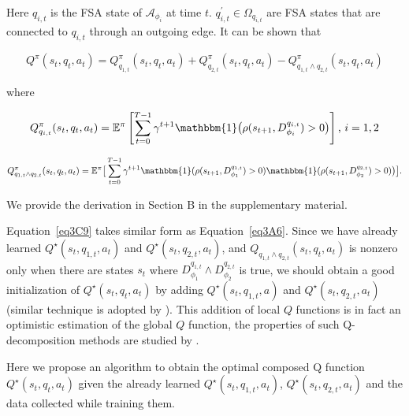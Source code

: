 \documentclass{article}
\begin{document}
\noindent Here $q_{i,t}$ is the FSA state of $\mathcal{A}_{\phi_i}$ at time $t$. $q_{i,t}^\prime \in \Omega_{q_{i,t}}$ are FSA states that are connected to $q_{i,t}$ through an outgoing edge. It can be shown that 

\begin{equation}\label{eq3C8}
Q^\pi(s_t, q_t, a_t) = Q^\pi_{q_{1,t}}(s_t, q_t, a_t) + Q^\pi_{q_{2,t}}(s_t, q_t, a_t) - Q^\pi_{q_{1,t} \wedge q_{2,t}}(s_t, q_t, a_t)
\end{equation}

\noindent where

\begin{equation}\label{eq3C9}
Q^\pi_{q_{i,t}}(s_t, q_t, a_t) = \mathbb{E}^\pi\left[\sum_{t=0}^{T-1} \gamma^{t+1}\mathbbm{1}\big(\rho(s_{t+1},D_{\phi_i}^{q_{i,t}})>0\big)\right] \textrm{, } i=1,2
\end{equation}

\begin{equation}\label{eq3C10}
Q^\pi_{q_{1,t} \wedge q_{2,t}}(s_t, q_t, a_t)=\mathbb{E}^\pi\big [ \sum^{T-1}_{t=0}\gamma^{t+1} \mathbbm{1}(\rho(s_{t+1},D_{\phi_1}^{q_{1,t}})>0)\mathbbm{1}(\rho(s_{t+1},D_{\phi_2}^{q_{2,t}})>0)\big)\big].
\end{equation}

\noindent We provide the derivation in Section B in the supplementary material.

Equation~\eqref{eq3C9} takes similar form as Equation~\eqref{eq3A6}. Since we have already learned $Q^\star(s_t,q_{1,t},a_t)$ and $Q^\star(s_t,q_{2,t},a_t)$, and $Q_{q_{1,t} \wedge q_{2,t}}(s_t, q_t, a_t)$ is nonzero only when there are states $s_t$ where $D^{q_{1,t}}_{\phi_1} \wedge D^{q_{2,t}}_{\phi_2}$ is true, we should obtain a good initialization of $Q^\star(s_t,q_t,a_t)$ by adding $Q^\star(s_t,q_{1,t},a)$ and $Q^\star(s_t,q_{2,t},a_t)$ (similar technique is adopted by \cite{haarnoja2018composable}). This addition of local $Q$ functions is in fact an optimistic estimation of the global $Q$ function, the properties of such Q-decomposition methods are studied by \cite{russell2003q}. 

Here we propose an algorithm to obtain the optimal composed Q function $Q^\star(s_t,q_t,a_t)$ given the already learned $Q^\star(s_t,q_{1,t},a_t)$, $Q^\star(s_t,q_{2,t},a_t)$ and the data collected while training them.
\end{document}
